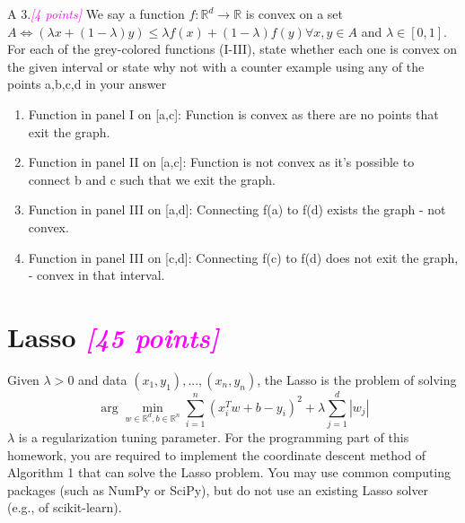 \documentclass{article}
\newcommand{\argmin}{\arg\!\min}
\newcommand{\field}[1]{\mathbb{#1}}
\newcommand{\1}{\mathbf{1}}
\newcommand{\R}{\field{R}} %
\newcommand{\points}[1]{\small\textcolor{magenta}{\emph{[#1 points]}} \normalsize}
\begin{document}
\newpage 
A 3.\points{4} We say a function $f:\R^d\rightarrow\R$ is convex on a set $A \iff (\lambda x + (1-\lambda)y)\leq \lambda f(x) + (1-\lambda)f(y) \forall x,y \in A$ and $\lambda\in [0,1]$. For each of the grey-colored functions (I-III), state whether each one is convex on the given interval or state why not with a counter example using any of the points a,b,c,d in your answer

\begin{enumerate}
    \item Function in panel I on [a,c]: Function is convex as there are no points that exit the graph.
    \item Function in panel II on [a,c]: Function is not convex as it's possible to connect b and c such that we exit the graph.
    \item Function in panel III on [a,d]: Connecting f(a) to f(d) exists the graph - not convex.
    \item Function in panel III on [c,d]: Connecting f(c) to f(d) does not exit the graph, - convex in that interval.
\end{enumerate}{}




\newpage 
\section*{Lasso \points{45}}
Given $\lambda > 0$ and data $(x_1,y_1),...,(x_n,y_n)$, the Lasso is the problem of solving 
$$\argmin_{w\in\R^d,b\in\R^n} \sum_{i=1}^n (x^T_i w + b - y_i)^2 + \lambda\sum^d_{j=1}|w_j|$$
$\lambda$ is a regularization tuning parameter. For the programming part of this homework, you are required to implement the coordinate descent method of Algorithm 1 that can solve the Lasso problem. You may use common computing packages (such as NumPy or SciPy), but do not use an existing Lasso solver (e.g., of scikit-learn). 
\end{document}
